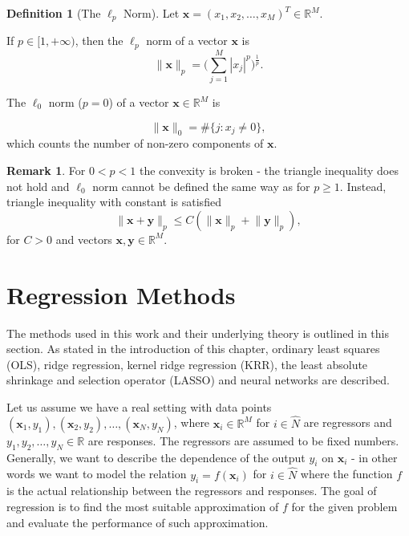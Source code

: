 \documentclass[11pt,oneside,czech,american]{book} %
\theoremstyle{plain}
\theoremstyle{definition}
\newtheorem{defn}{Definition}
\newtheorem{rmrk}{Remark}
\begin{document}
\begin{defn}[The {$\ell_{p}$ Norm}]
	Let $\bm{x}= ({x}_{1},{x}_{2},\dots,{x}_{M})^{T} \in \mathbb{R}^{M}$.
	\begin{enumerate}{
			\item If $p \in [1, +\infty)$, then the $\ell_{p}$ norm of a vector $\bm{x}$ is 
			\begin{equation}
				\lVert \bm{x}\rVert_{p} = \Bigg(\sum_{j=1}^{M}|{x}_j|^{p}\Bigg)^{ \frac{1}{p}}
				\label{lpnorm}.
		\end{equation}}
		
		\item {The $\ell_{0}$ norm ($p = 0$) of a vector $\bm{x} \in \mathbb{R}^M$ is 
			
			\begin{equation}
				\lVert \bm{x} \rVert_{0} = \#\{j:{x}_j\neq 0 \}, \label{l0norm}
			\end{equation} which counts the number of non-zero components of $\bm{x}$.}
	\end{enumerate}
\end{defn}

\begin{rmrk}
	For $0<p<1$ the convexity is broken - the triangle inequality does not hold and $\ell_{0}$ norm cannot be defined the same way as for $p\geq1$. Instead, triangle inequality with constant is satisfied
	\begin{equation}
		\lVert \bm{x} + \bm{y} \rVert_{p} \leq C ( \lVert \bm{x} \rVert_{p} + \lVert \bm{y} \rVert_{p} ),
	\end{equation}
	for $C>0$ and vectors $\bm{x},\bm{y} \in \mathbb{R}^M$.
\end{rmrk}

\section{Regression Methods}
The methods used in this work and their underlying theory is outlined in this section. As stated in the introduction of this chapter, ordinary least squares (OLS), ridge regression, kernel ridge regression (KRR), the least absolute shrinkage and selection operator (LASSO) and neural networks are described.

Let us assume we have a real setting with data points $(\bm{x}_1,y_1), (\bm{x}_2,y_2),\dots, (\bm{x}_N,y_N)$, where $\bm{x}_i \in \mathbb{R}^{M}$ for $i \in \hat{N}$ are regressors and $y_{1}, y_{2},\dots, y_{N} \in \mathbb{R}$ are responses. The regressors are assumed to be fixed numbers. Generally, we want to describe the dependence of the output $y_{i}$ on $\bm{x}_{i}$ - in other words we want to model the relation $y_{i}=f({\bm{x}}_{i})$ for $i \in \hat{N}$ where the function $f$ is the actual relationship between the regressors and responses. The goal of regression is to find the most suitable approximation of $f$ for the given problem and evaluate the performance of such approximation.
\end{document}
